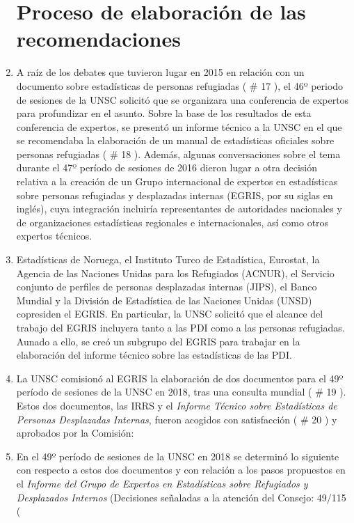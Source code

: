 \documentclass[
]{book}
\begin{document}
\begin{enumerate}
{  \section{Proceso de elaboración de las recomendaciones}\label{proceso-de-elaboraciuxf3n-de-las-recomendaciones}}
\item
  A raíz de los debates que tuvieron lugar en 2015 en relación con un documento sobre estadísticas de personas refugiadas (
  \# 17
  ), el 46º periodo de sesiones de la UNSC solicitó que se organizara una conferencia de expertos para profundizar en el asunto. Sobre la base de los resultados de esta conferencia de expertos, se presentó un informe técnico a la UNSC en el que se recomendaba la elaboración de un manual de estadísticas oficiales sobre personas refugiadas (
  \# 18
  ). Además, algunas conversaciones sobre el tema durante el 47º período de sesiones de 2016 dieron lugar a otra decisión relativa a la creación de un Grupo internacional de expertos en estadísticas sobre personas refugiadas y desplazadas internas (EGRIS, por su siglas en inglés), cuya integración incluiría representantes de autoridades nacionales y de organizaciones estadísticas regionales e internacionales, así como otros expertos técnicos.
\item
  Estadísticas de Noruega, el Instituto Turco de Estadística, Eurostat, la Agencia de las Naciones Unidas para los Refugiados (ACNUR), el Servicio conjunto de perfiles de personas desplazadas internas (JIPS), el Banco Mundial y la División de Estadística de las Naciones Unidas (UNSD) copresiden el EGRIS. En particular, la UNSC solicitó que el alcance del trabajo del EGRIS incluyera tanto a las PDI como a las personas refugiadas. Aunado a ello, se creó un subgrupo del EGRIS para trabajar en la elaboración del informe técnico sobre las estadísticas de las PDI.
\item
  La UNSC comisionó al EGRIS la elaboración de dos documentos para el 49º período de sesiones de la UNSC en 2018, tras una consulta mundial (
  \# 19
  ). Estos dos documentos, las IRRS y el \emph{Informe Técnico sobre Estadísticas de Personas Desplazadas Internas}, fueron acogidos con satisfacción (
  \# 20
  ) y aprobados por la Comisión:
\item
  En el 49º período de sesiones de la UNSC en 2018 se determinó lo siguiente con respecto a estos dos documentos y con relación a los pasos propuestos en el \emph{Informe del Grupo de Expertos en Estadísticas sobre Refugiados y Desplazados Internos} (Decisiones señaladas a la atención del Consejo: 49/115 (

\end{enumerate}
\end{document}
